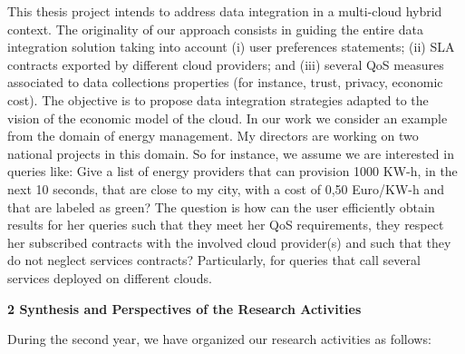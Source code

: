 \documentclass[11pt,a4paper,oneside]{report}
\begin{document}

This thesis project intends to address data integration in a multi-cloud hybrid context. The originality of our approach consists in guiding the entire data integration solution taking into account (i) user preferences statements; (ii) SLA contracts exported by different cloud providers; and (iii) several QoS measures associated to data collections properties (for instance, trust, privacy, economic cost). The objective is to propose data integration strategies adapted to the vision of the economic model of the cloud.
%
In our work we consider an example from the domain of energy management. My directors are working on two national projects in this domain. So for instance, we assume we are interested in queries like: Give a list of energy providers that can provision 1000 KW-h, in the next 10 seconds, that are close to my city, with a cost of 0,50 Euro/KW-h and that are labeled as green? The question is how can the user efficiently obtain results for her queries such that they meet her QoS requirements, they respect her subscribed contracts with the involved cloud provider(s) and such that they do not neglect services contracts? Particularly, for queries that call several services deployed on different clouds. 
 
\begin{flushleft}
\textbf{2 Synthesis and Perspectives of the Research Activities}\\
\end{flushleft}
During the second year, we have organized our research activities as follows:
\end{document}

